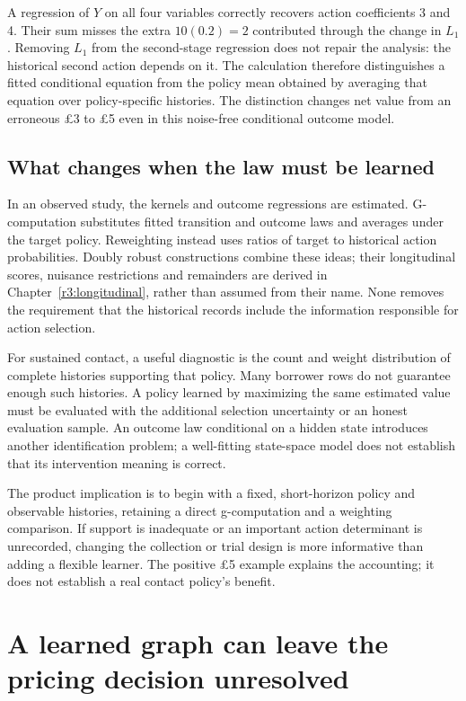 A regression of $Y$ on all four variables correctly recovers action
coefficients 3 and 4. Their sum misses the extra $10(0.2)=2$ contributed
through the change in $L_1$. Removing $L_1$ from the second-stage regression
does not repair the analysis: the historical second action depends on it.
The calculation therefore distinguishes a fitted conditional equation from
the policy mean obtained by averaging that equation over policy-specific
histories. The distinction changes net value from an erroneous \pounds3
to \pounds5 even in this noise-free conditional outcome model.

\section{What changes when the law must be learned}
In an observed study, the kernels and outcome regressions are estimated.
G-computation substitutes fitted transition and outcome laws and averages
under the target policy. Reweighting instead uses ratios of target to
historical action probabilities. Doubly robust constructions combine these
ideas; their longitudinal scores, nuisance restrictions and remainders are
derived in Chapter~\ref{r3:longitudinal}, rather than assumed from their
name. None removes the requirement that the historical records include
the information responsible for action selection.

For sustained contact, a useful diagnostic is the count and weight
distribution of complete histories supporting that policy. Many borrower
rows do not guarantee enough such histories. A policy learned by maximizing
the same estimated value must be evaluated with the additional selection
uncertainty or an honest evaluation sample. An outcome law conditional on
a hidden state introduces another identification problem; a well-fitting
state-space model does not establish that its intervention meaning is correct.

The product implication is to begin with a fixed, short-horizon policy and
observable histories, retaining a direct g-computation and a weighting
comparison. If support is inadequate or an important action determinant is
unrecorded, changing the collection or trial design is more informative than
adding a flexible learner. The positive \pounds5 example explains the
accounting; it does not establish a real contact policy's benefit.

\chapter{A learned graph can leave the pricing decision unresolved}
\label{rewrite:discovery}

